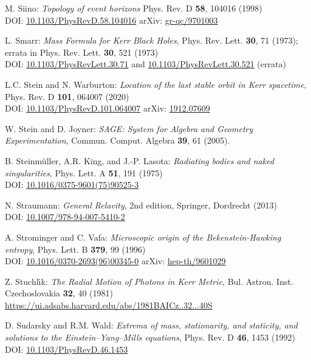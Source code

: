 \begin{thebibliography}{123}
M. Siino: {\em Topology of event horizons}
Phys. Rev. D {\bf 58}, 104016 (1998)\\
DOI: \href{https://doi.org/10.1103/PhysRevD.58.104016}{10.1103/PhysRevD.58.104016}\hfill
arXiv: \href{https://arxiv.org/abs/gr-qc/9701003}{gr-qc/9701003}

L. Smarr: {\em Mass Formula for Kerr Black Holes},
Phys. Rev. Lett. {\bf 30}, 71 (1973); errata in Phys. Rev. Lett. {\bf 30}, 521 (1973)\\
DOI: \href{https://doi.org/10.1103/PhysRevLett.30.71}{10.1103/PhysRevLett.30.71}
and
\href{https://doi.org/10.1103/PhysRevLett.30.521}{10.1103/PhysRevLett.30.521} (errata)

L.C. Stein and N. Warburton:
{\em Location of the last stable orbit in Kerr spacetime},
Phys. Rev. D  {\bf 101}, 064007 (2020)\\
DOI: \href{https://doi.org/10.1103/PhysRevD.101.064007}{10.1103/PhysRevD.101.064007}\hfill
arXiv: \href{https://arxiv.org/abs/1912.07609}{1912.07609}

W. Stein and D. Joyner:
{\em SAGE: System for Algebra and Geometry Experimentation},
Commun. Comput. Algebra {\bf 39}, 61 (2005).

B. Steinmüller, A.R. King, and J.-P. Lasota:
{\em Radiating bodies and naked singularities},
Phys. Lett. A {\bf 51}, 191 (1975)\\
DOI: \href{https://doi.org/10.1016/0375-9601(75)90525-3}{10.1016/0375-9601(75)90525-3}

N. Straumann:
{\em General Relavity}, 2nd edition,
Springer, Dordrecht (2013)\\
DOI: \href{https://doi.org/10.1007/978-94-007-5410-2}{10.1007/978-94-007-5410-2}

A. Strominger and C. Vafa:
{\em Microscopic origin of the Bekenstein-Hawking entropy},
Phys. Lett. B {\bf 379}, 99 (1996)\\
DOI: \href{https://doi.org/10.1016/0370-2693(96)00345-0}{10.1016/0370-2693(96)00345-0}\hfill
arXiv: \href{https://arxiv.org/abs/hep-th/9601029}{hep-th/9601029}

Z. Stuchl\'{\i}k: {\em The Radial Motion of Photons in Kerr Metric},
Bul. Astron. Inst. Czechoslovakia {\bf 32}, 40 (1981)\\
\url{https://ui.adsabs.harvard.edu/abs/1981BAICz..32...40S}

D. Sudarsky and R.M. Wald: {\em Extrema of mass, stationarity, and staticity,
and solutions to the Einstein–Yang–Mills equations},
Phys. Rev. D {\bf 46}, 1453 (1992)\\
DOI: \href{https://doi.org/10.1103/PhysRevD.46.1453}{10.1103/PhysRevD.46.1453}


\end{thebibliography}
